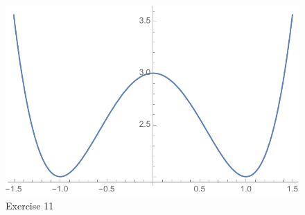 \documentclass[letterpaper]{exam}
\begin{document}
\begin{description}
      \begin{figure}[H]
        \centering
        \includegraphics[scale = 0.6]{ex11.pdf}
        \caption{Exercise 11}
        \label{fig:ex11}
      \end{figure}

    \newpage




          




\end{description}
\end{document}
